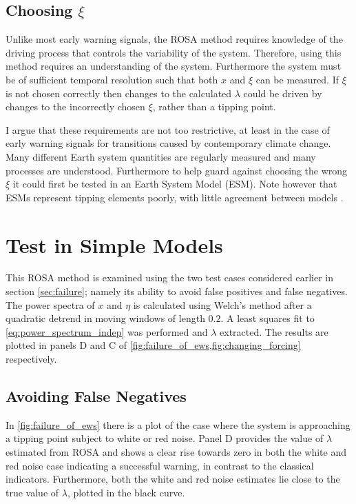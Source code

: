 \subsection{Choosing $\xi$}
Unlike most early warning signals, the ROSA method requires knowledge of
the driving process that controls the variability of the system.
Therefore, using this method requires an understanding
of the system. Furthermore the system must be of sufficient temporal resolution such that 
both $x$ and $\xi$ can be measured. If $\xi$ is not chosen
correctly then changes to the calculated $\lambda$ could be driven
by changes to the incorrectly chosen $\xi$, rather than a 
tipping point. 

I argue that these requirements are not too restrictive, at least in the 
case of early warning signals for transitions caused by contemporary
climate change. Many different Earth system quantities are regularly 
measured and many processes are understood. Furthermore to help 
guard against choosing the wrong $\xi$ it could first be tested in an Earth System Model (ESM). Note however that ESMs represent tipping elements 
poorly, with little agreement between models \parencite{Drijfhout2015}.


\section{Test in Simple Models}
This ROSA method is examined using the two test cases considered earlier in 
section \cref{sec:failure}; namely its ability to avoid 
false positives and false negatives.
The power spectra of $x$ and $\eta$ is calculated 
using Welch's method \parencite{Welch1967} after a quadratic 
detrend in moving windows of length $0.2$. A least
squares fit to
\cref{eq:power_spectrum_indep} was performed and $\lambda$ extracted. 
The results are plotted in panels D and C of \cref{fig:failure_of_ews,fig:changing_forcing} respectively.

\subsection{Avoiding False Negatives}
In \cref{fig:failure_of_ews} there is a plot of the case
where the system is approaching a tipping point
subject to white or red noise. Panel D provides
the value of $\lambda$ estimated from ROSA and shows a clear
rise towards zero in both the white and red noise case indicating
a successful warning, in contrast to the classical indicators. Furthermore, both the
white and red noise estimates lie close to the true value of 
$\lambda$, plotted in the black curve.

